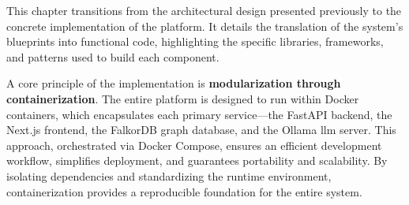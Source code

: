This chapter transitions from the architectural design presented previously to the concrete implementation of the platform. It details the translation of the system's blueprints into functional code, highlighting the specific libraries, frameworks, and patterns used to build each component.

A core principle of the implementation is \textbf{modularization through containerization}. The entire platform is designed to run within Docker containers, which encapsulates each primary service---the FastAPI backend, the Next.js frontend, the FalkorDB graph database, and the Ollama \ac{llm} server. This approach, orchestrated via Docker Compose, ensures an efficient development workflow, simplifies deployment, and guarantees portability and scalability. By isolating dependencies and standardizing the runtime environment, containerization provides a reproducible foundation for the entire system.